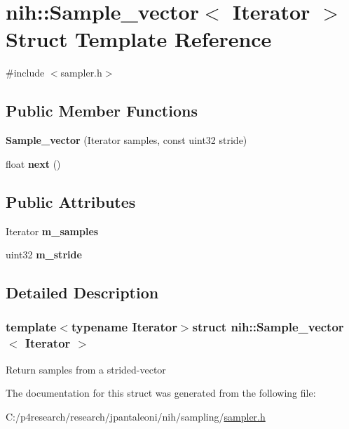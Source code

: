 \hypertarget{structnih_1_1_sample__vector}{
\section{nih\-:\-:\-Sample\-\_\-vector$<$ \-Iterator $>$ \-Struct \-Template \-Reference}
\label{structnih_1_1_sample__vector}
}


{\ttfamily \#include $<$sampler.\-h$>$}

\subsection*{\-Public \-Member \-Functions}
\begin{DoxyCompactItemize}
\item 
\hypertarget{structnih_1_1_sample__vector_ad0270af6641d36a8f98cf82d0176afdc}{
{\bfseries \-Sample\-\_\-vector} (\-Iterator samples, const uint32 stride)}
\label{structnih_1_1_sample__vector_ad0270af6641d36a8f98cf82d0176afdc}

\item 
\hypertarget{structnih_1_1_sample__vector_ae27a7bfd068b46892fa1aac7edd54e74}{
float {\bfseries next} ()}
\label{structnih_1_1_sample__vector_ae27a7bfd068b46892fa1aac7edd54e74}

\end{DoxyCompactItemize}
\subsection*{\-Public \-Attributes}
\begin{DoxyCompactItemize}
\item 
\hypertarget{structnih_1_1_sample__vector_af8f75c9125bdc11c898c38b3baf3bdce}{
\-Iterator {\bfseries m\-\_\-samples}}
\label{structnih_1_1_sample__vector_af8f75c9125bdc11c898c38b3baf3bdce}

\item 
\hypertarget{structnih_1_1_sample__vector_af678a3ff643eb31beee1fc7309609045}{
uint32 {\bfseries m\-\_\-stride}}
\label{structnih_1_1_sample__vector_af678a3ff643eb31beee1fc7309609045}

\end{DoxyCompactItemize}


\subsection{\-Detailed \-Description}
\subsubsection*{template$<$typename Iterator$>$struct nih\-::\-Sample\-\_\-vector$<$ Iterator $>$}

\-Return samples from a strided-\/vector 

\-The documentation for this struct was generated from the following file\-:\begin{DoxyCompactItemize}
\item 
\-C\-:/p4research/research/jpantaleoni/nih/sampling/\hyperlink{sampler_8h}{sampler.\-h}\end{DoxyCompactItemize}
